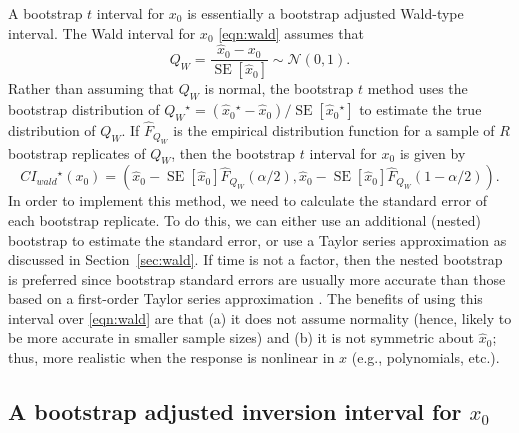 \documentclass{article}\usepackage[]{graphicx}\usepackage[]{color}
\newcommand{\boot}{\ensuremath{^\star}}
\newcommand{\SE}{\operatorname{SE}}
\begin{document}
A bootstrap $t$ interval for $x_0$ is essentially a bootstrap adjusted Wald-type interval.  The Wald interval for $x_0$ \eqref{eqn:wald} assumes that
\[
  Q_W = \frac{\widehat{x}_0 - x_0}{\SE\left[\widehat{x}_0\right]} \sim \mathcal{N}(0, 1).
\]
Rather than assuming that $Q_W$ is normal, the bootstrap $t$ method uses the bootstrap distribution of $Q_W\boot = \left(\widehat{x}_0\boot - \widehat{x}_0\right)/\SE\left[\widehat{x}_0\boot\right]$ to estimate the true distribution of $Q_W$.  If $\widehat{F}_{Q_W}$ is the empirical distribution function for a sample of $R$ bootstrap replicates of $Q_W$, then the bootstrap $t$  interval for $x_0$ is given by
\[
    CI_{wald}\boot\left(x_0\right) = \left( \widehat{x}_0 -  \SE\left[\widehat{x}_0\right]\widehat{F}_{Q_W}\left(\alpha/2\right),  \widehat{x}_0 -  \SE\left[\widehat{x}_0\right]\widehat{F}_{Q_W}\left(1-\alpha/2\right) \right).
\]
In order to implement this method, we need to calculate the standard error of each bootstrap replicate.  To do this, we can either use an additional (nested) bootstrap to estimate the standard error, or use a Taylor series approximation as discussed in Section~\ref{sec:wald}.  If time is  not a factor, then the nested bootstrap is preferred since bootstrap standard errors are usually more accurate than those based on a first-order Taylor series approximation \citep[pp. 478-480]{casella-statistical-2002}.  The benefits of using this interval over \eqref{eqn:wald} are that (a) it does not assume normality (hence, likely to be more accurate in smaller sample sizes) and (b) it is not symmetric about $\widehat{x}_0$; thus, more realistic when the response is nonlinear in $x$ (e.g., polynomials, etc.).


\subsection{A bootstrap adjusted inversion interval for $x_0$}
\end{document}
